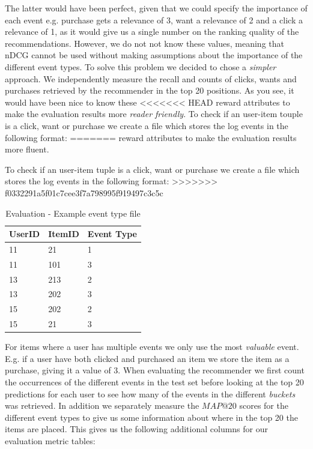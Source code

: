 The latter would have been perfect, given that we could specify the importance of each event e.g. purchase gets a relevance of 3, want
a relevance of 2 and a click a relevance of 1, as it would give us a single number on the ranking quality of the recommendations.
However, we do not not know these values, meaning that nDCG cannot be used without making assumptions about the importance of the different
event types. To solve this problem we decided to chose a \emph{simpler} approach. We independently measure the recall
and counts of clicks, wants and purchases retrieved by the recommender in the top 20 positions. As you see, it would have been nice to know these
<<<<<<< HEAD
reward attributes to make the evaluation results more \emph{reader friendly}. To check if an user-item touple is a click, want or purchase we create
a file which stores the log events in the following format:
=======
reward attributes to make the evaluation results more fluent.

To check if an user-item tuple is a click, want or purchase we create a file which
stores the log events in the following format:
>>>>>>> f0332291a5f01c7cee3f7a798995f919497c3c5c

\begin{table}[H]
\centering
\begin{tabular}{*{3}l}
\toprule
UserID	&	ItemID	 &  Event Type  \\ \midrule
11		&	21		 &	1			\\
11		&	101		 &	3			\\
13		&	213		 &	2			\\
13		&	202		 &  3			\\
15		&	202		 &  2			\\
15		&	21		 &  3			\\
\bottomrule
\end{tabular}
\caption{Evaluation - Example event type file}
\label{table:event-type}
\end{table}

For items where a user has multiple events we only use the most \emph{valuable} event. E.g. if a user have both clicked
and purchased an item we store the item as a purchase, giving it a value of 3. When evaluating the recommender we first count the
occurrences of the different events in the test set before looking at the top 20 predictions for each user to see how many of the events in the
different \emph{buckets} was retrieved. In addition we separately measure the $MAP@20$ scores for the different event types to give us some information
about where in the top 20 the items are placed. This gives us the following additional columns for our evaluation metric tables:

